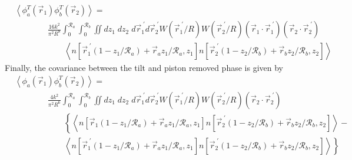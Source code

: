 \begin{equation}\label{eqn:tphase_n}
\begin{aligned}
&\left\langle \phi^{T}_{a}\left(\vec{r}_{1}\right) \phi^{T}_{b}\left(\vec{r}_{2}\right)\right\rangle = \\
&\quad\quad\quad\quad
\frac{16 k^{2}}{\pi^{2}R^{8}} \int_{0}^{\mathcal{R}_{a}}  \int_{0}^{\mathcal{R}_{b}} \iint dz_{1} \; dz_{2} \; d\vec{r}^{\;\prime}_{1}d\vec{r}^{\;\prime}_{2} W(\vec{r}^{\;\prime}_{1}/R) W(\vec{r}^{\;\prime}_{2}/R)
\left(\vec{r}_{1} \cdot \vec{r}^{\;\prime}_{1}\right)
\left(\vec{r}_{2} \cdot \vec{r}^{\;\prime}_{2}\right)
\\
&\quad\quad\quad\quad\quad\quad
\left\langle n\left[\vec{r}^{\;\prime}_{1}\left(1-z_{1}/\mathcal{R}_{a}\right) + \vec{r}_{a} z_{1}/\mathcal{R}_{a}, z_{1}\right]
 n\left[\vec{r}^{\;\prime}_{2}\left(1-z_{2}/\mathcal{R}_{b}\right) + \vec{r}_{b} z_{2}/\mathcal{R}_{b}, z_{2}\right] \right\rangle
\end{aligned}
\end{equation}
Finally, the covariance between the tilt and piston removed phase is given by 
\begin{equation}\label{eqn:tprphase_n}
\begin{aligned}
&\left\langle \phi_{a}\left(\vec{r}_{1}\right) \phi^{T}_{b}\left(\vec{r}_{2}\right)\right\rangle = \\
&\quad\quad\quad\quad
\frac{4 k^{2}}{\pi^{2}R^{6}} \int_{0}^{\mathcal{R}_{a}}  \int_{0}^{\mathcal{R}_{b}} \iint dz_{1} \; dz_{2} \; d\vec{r}^{\;\prime}_{1}d\vec{r}^{\;\prime}_{2} W(\vec{r}^{\;\prime}_{1}/R) W(\vec{r}^{\;\prime}_{2}/R)
\left(\vec{r}_{2} \cdot \vec{r}^{\;\prime}_{2}\right)
\\
&\quad\quad\quad\quad\quad\quad
\left\{
\left\langle n\left[\vec{r}_{1}\left(1-z_{1}/\mathcal{R}_{a}\right) + \vec{r}_{a} z_{1}/\mathcal{R}_{a}, z_{1}\right]
 n\left[\vec{r}^{\;\prime}_{2}\left(1-z_{2}/\mathcal{R}_{b}\right) + \vec{r}_{b} z_{2}/\mathcal{R}_{b}, z_{2}\right] \right\rangle - 
\right.
\\
&\quad\quad\quad\quad\quad\quad
\left.
\left\langle n\left[\vec{r}^{\;\prime}_{1}\left(1-z_{1}/\mathcal{R}_{a}\right) + \vec{r}_{a} z_{1}/\mathcal{R}_{a}, z_{1}\right]
 n\left[\vec{r}^{\;\prime}_{2}\left(1-z_{2}/\mathcal{R}_{b}\right) + \vec{r}_{b} z_{2}/\mathcal{R}_{b}, z_{2}\right] \right\rangle
\right\}
\end{aligned}
\end{equation}


